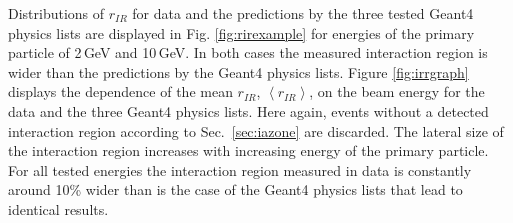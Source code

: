 Distributions of $r_{IR}$ for data and the predictions by the three tested {\sc Geant4} physics lists are displayed in Fig. \ref{fig:rirexample}
for energies of the primary particle of 2\,GeV and 10\,GeV. In both cases the measured interaction region is wider than the predictions by the {\sc Geant}4 physics lists.  
Figure \ref{fig:irrgraph} displays the dependence of the mean $r_{IR}$, $\left<r_{IR}\right>$, on the beam energy for the data and the three {\sc Geant4} physics lists. Here again, events without a detected interaction region according to Sec.~\ref{sec:iazone} are discarded. The lateral size of the interaction region increases with increasing energy of the primary particle. For all tested energies the interaction region measured in data is constantly around 10\% wider than is the case of the {\sc Geant}4 physics lists that lead to identical results. 

